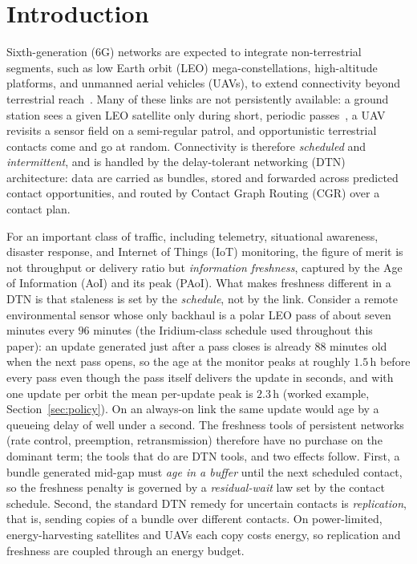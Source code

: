 \documentclass[twocolumn,3p,times,procedia]{elsarticle}
\theoremstyle{plain}
\theoremstyle{remark}
\begin{document}
\section{Introduction}
Sixth-generation (6G) networks are expected to integrate
non-terrestrial segments, such as low Earth orbit (LEO)
mega-constellations, high-altitude platforms, and unmanned aerial
vehicles (UAVs), to extend connectivity beyond terrestrial
reach~\cite{jiang2023sdn,ullah2025mgmt,he2026wass}.
Many of these links are not persistently available: a ground station
sees a given LEO satellite only during short, periodic
passes~\cite{he2026ngso}, a UAV
revisits a sensor field on a semi-regular patrol, and opportunistic
terrestrial contacts come and go at random. Connectivity is therefore
\emph{scheduled} and \emph{intermittent}, and is handled by the
delay-tolerant networking (DTN) architecture: data are carried as
bundles, stored and forwarded across predicted contact opportunities,
and routed by Contact Graph Routing (CGR) over a contact plan.

For an important class of traffic, including telemetry, situational
awareness, disaster response, and Internet of Things (IoT) monitoring,
the figure of merit is not throughput or delivery ratio but
\emph{information freshness}, captured by the Age of Information (AoI)
and its peak (PAoI). What makes
freshness different in a DTN is that staleness is set by the
\emph{schedule}, not by the link. Consider a remote environmental sensor
whose only backhaul is a polar LEO pass of about seven minutes every
$96$ minutes (the Iridium-class schedule used throughout this paper):
an update generated just after a pass closes is already $88$ minutes
old when the next pass opens, so the age at the monitor peaks at roughly
$1.5$\,h before every pass even though the pass itself delivers the
update in seconds, and with one update per orbit the mean per-update
peak is $2.3$\,h (worked example, Section~\ref{sec:policy}). On an
always-on link the same update would age by a queueing delay of well
under a second. The freshness tools of persistent networks (rate
control, preemption, retransmission) therefore have no purchase on the
dominant term; the tools that do are DTN tools, and two effects follow.
First, a bundle generated mid-gap must \emph{age in a buffer} until the
next scheduled contact, so the freshness penalty is governed by a
\emph{residual-wait} law set by the contact schedule. Second, the
standard DTN remedy for uncertain contacts is \emph{replication}, that
is, sending copies of a bundle over different contacts. On power-limited,
energy-harvesting satellites and UAVs each copy costs energy, so
replication and freshness are coupled through an energy budget.
\end{document}
